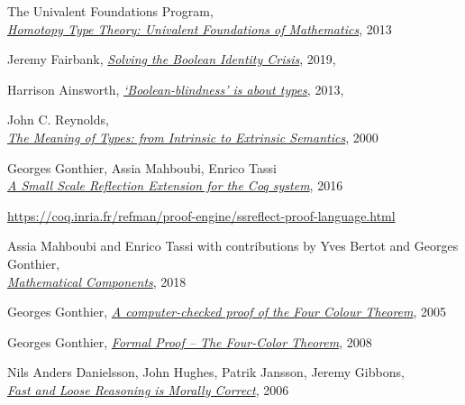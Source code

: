 \documentclass[declaration,mgr,english,shortabstract]{iithesis}
\begin{document}
\begin{thebibliography}{1}
    The Univalent Foundations Program, \\
    \href{https://homotopytypetheory.org/book/}{\textit{Homotopy Type Theory: Univalent Foundations of Mathematics}},
    2013

    Jeremy Fairbank,
    \href{https://medium.com/swlh/solving-the-boolean-identity-crisis-33eeccde2c96}{\textit{Solving the Boolean Identity Crisis}},
    2019, \\

    Harrison Ainsworth,
    \href{http://www.hxa.name/notes/note-hxa7241-20131124T0927Z.html}{\textit{‘Boolean-blindness’ is about types}},
    2013, \\

    John C. Reynolds, \\
    \href{https://www.cs.cmu.edu/afs/cs/user/jcr/ftp/typemeaning.pdf}{\textit{The Meaning of Types: from Intrinsic to Extrinsic Semantics}},
    2000

    Georges Gonthier, Assia Mahboubi, Enrico Tassi \\
    \href{https://hal.inria.fr/inria-00258384v17/document}{\textit{A Small Scale Reflection Extension for the Coq system}}, 2016

    \url{https://coq.inria.fr/refman/proof-engine/ssreflect-proof-language.html}
    
    Assia Mahboubi and Enrico Tassi with contributions by Yves Bertot and Georges Gonthier, \\
    \href{https://math-comp.github.io/mcb/}{\textit{Mathematical Components}}, 2018

    Georges Gonthier,
    \href{https://www.cl.cam.ac.uk/~lp15/Pages/4colproof.pdf}{\textit{A computer-checked proof of the Four Colour Theorem}}, 2005

    Georges Gonthier,
    \href{http://www.ams.org/notices/200811/tx081101382p.pdf}{\textit{Formal Proof -- The Four-Color Theorem}}, 2008

    Nils Anders Danielsson, John Hughes, Patrik Jansson, Jeremy Gibbons, \\
    \href{https://www.cs.ox.ac.uk/jeremy.gibbons/publications/fast+loose.pdf}{\textit{Fast and Loose Reasoning is Morally Correct}}, 2006


\end{thebibliography}
\end{document}
